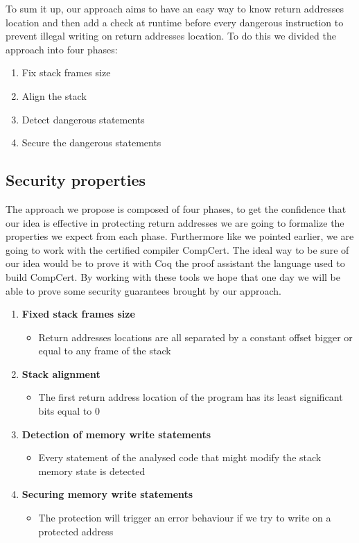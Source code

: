 \documentclass[11pt]{sdm}
\begin{document}
\hfill \break 
	To sum it up, our approach aims to have an easy way to know return addresses location and then add a check at runtime before every dangerous instruction to prevent illegal writing on return addresses location.
To do this we divided the approach into four phases:
\begin{enumerate}
	\item Fix stack frames size
	\item Align the stack
	\item Detect dangerous statements
	\item Secure the dangerous statements
\end{enumerate}


\subsection{Security properties}
\label{sub:Security properties}
	The approach we propose is composed of four phases, to get the confidence that our idea is effective in protecting return addresses we are going to formalize the properties we expect from each phase. 
Furthermore like we pointed earlier, we are going to work with the certified compiler CompCert.
The ideal way to be sure of our idea would be to prove it with Coq the proof assistant the language used to build CompCert.
By working with these tools we hope that one day we will be able to prove some security guarantees brought by our approach.

\begin{enumerate}
	\item \textbf{Fixed stack frames size}
		\begin{itemize}
			\item Return addresses locations are all separated by a constant offset bigger or equal to any frame of the stack
		\end{itemize}
	\item \textbf{Stack alignment}
		\begin{itemize}
			\item The first return address location of the program has its least significant bits equal to 0
		\end{itemize}
	\item \textbf{Detection of memory write statements}
		\begin{itemize}
			\item Every statement of the analysed code that might modify the stack memory state is detected
		\end{itemize}
	\item \textbf{Securing memory write statements}
		\begin{itemize}
			\item The protection will trigger an error behaviour if we try to write on a protected address
		\end{itemize}
\end{enumerate}
\end{document}
